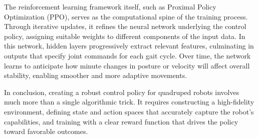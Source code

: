 The reinforcement learning framework itself, such as Proximal Policy Optimization (PPO), serves as the computational spine of the training process. Through iterative updates, it refines the neural network underlying the control policy, assigning suitable weights to different components of the input data. In this network, hidden layers progressively extract relevant features, culminating in outputs that specify joint commands for each gait cycle. Over time, the network learns to anticipate how minute changes in posture or velocity will affect overall stability, enabling smoother and more adaptive movements.

In conclusion, creating a robust control policy for quadruped robots involves much more than a single algorithmic trick. It requires constructing a high-fidelity environment, defining state and action spaces that accurately capture the robot’s capabilities, and training with a clear reward function that drives the policy toward favorable outcomes.
